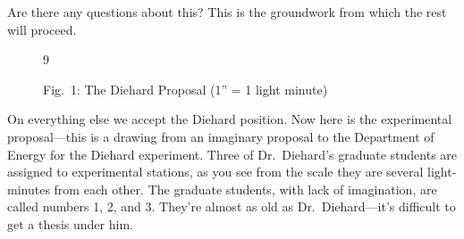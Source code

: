 \documentclass[12pt,nofootinbib]{revtex4}
\begin{document}
Are there any questions about this? This is the groundwork from which the rest will proceed.
\begin{figure}[htb] 
\begin{mdframed}
  \vspace{5pt}\hfill 9\\[-11pt]
  \begin{center}
  \end{center}
  \begin{center}
    {Fig.~1: The Diehard Proposal (1'' = 1 light minute)}
  \end{center}
  \vspace{6pt}
\end{mdframed}
\end{figure}

On everything else we accept the Diehard position. Now here is the experimental proposal---this is a drawing from an imaginary proposal to the Department of Energy for the Diehard experiment. Three of Dr.\ Diehard's graduate students are assigned to experimental stations, as you see from the scale they are several light-minutes from each other. The graduate students, with lack of imagination, are called numbers 1, 2, and 3. They're almost as old as Dr.\ Diehard---it's difficult to get a thesis under him.
\end{document}
